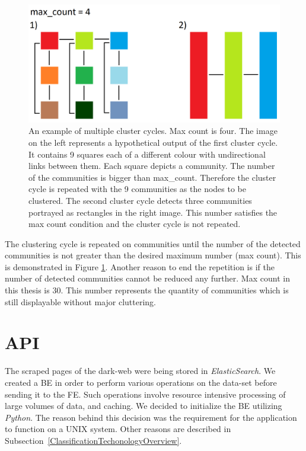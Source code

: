 \begin{figure}[ht!]
  \centering
  \includegraphics[width=\textwidth]{Images/clusteringCyclesExample.png}
  \caption{An example of multiple cluster cycles. Max count is four. The image on the left represents a hypothetical output of the first cluster cycle. It contains 9 squares each of a different colour with undirectional links between them. Each square depicts a community. The number of the communities is bigger than max\_count. Therefore the cluster cycle is repeated with the 9 communities as the nodes to be clustered. The second cluster cycle detects three communities portrayed as rectangles in the right image. This number satisfies the max count condition and the cluster cycle is not repeated.}
  \label{clusteringCyclesExample}
\end{figure} 

The clustering cycle is repeated on communities until the number of the detected communities is not greater than the desired maximum number (max count). This is demonstrated in Figure \ref{clusteringCyclesExample}. Another reason to end the repetition is if the number of detected communities cannot be reduced any further. Max count in this thesis is 30. This number represents the quantity of communities which is still displayable without major cluttering.




\section{API}\label{APIDevelopment}
The scraped pages of the dark-web were being stored in \textit{ElasticSearch}. We created a BE in order to perform various operations on the data-set before sending it to the FE. Such operations involve resource intensive processing of large volumes of data, and caching. We decided to initialize the BE utilizing \textit{Python}. The reason behind this decision was the requirement for the application to function on a UNIX system. Other reasons are described in Subsection~\ref{ClassificationTechonologyOverview}. 

